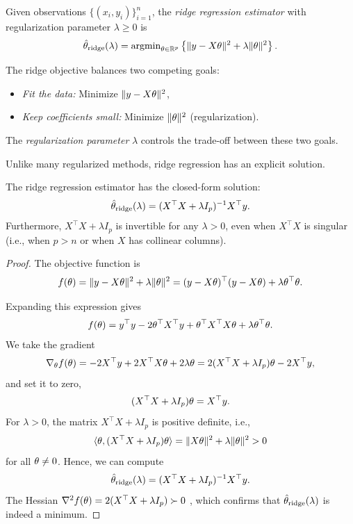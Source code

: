 \begin{definition}\label{def:ridge}
Given observations $\{(x_i, y_i)\}_{i=1}^n$, the \emph{ridge regression estimator} 
with regularization parameter $\lambda \geq 0$ is
\begin{equation}\label{eq:ridge_def}
  \hat{\theta}_{\text{ridge}}(\lambda) = \operatorname{argmin}_{\theta \in \mathbb{R}^p} 
  \left\{\|y - X\theta\|^2 + \lambda\|\theta\|^2\right\}.
\end{equation}
\end{definition}

The ridge objective balances two competing goals:
\begin{itemize}
  \item {\em Fit the data:} Minimize $\|y - X\theta\|^2$,
  \item {\em Keep coefficients small:} Minimize $\|\theta\|^2$ (regularization).
\end{itemize}
The {\em regularization parameter} $\lambda$ controls the trade-off between these two goals.

Unlike many regularized methods, ridge regression has an explicit solution.

\begin{theorem}\label{thm:ridge_solution}
The ridge regression estimator has the closed-form solution:
\begin{equation}\label{eq:ridge_normal}
  \hat{\theta}_{\text{ridge}}(\lambda) = (X^\top X + \lambda I_p)^{-1}X^\top y.
\end{equation}
Furthermore, $X^\top X + \lambda I_p$ is invertible for any $\lambda > 0$, 
even when $X^\top X$ is singular (i.e., when $p > n$ or when $X$ has 
collinear columns).
\end{theorem}

\begin{proof}
The objective function is
$$f(\theta) = \|y - X\theta\|^2 + \lambda\|\theta\|^2 
= (y - X\theta)^\top(y - X\theta) + \lambda\theta^\top\theta.$$

Expanding this expression gives
$$f(\theta) = y^\top y - 2\theta^\top X^\top y + \theta^\top X^\top X\theta + \lambda\theta^\top\theta.$$
We take the gradient 
$$\nabla_{\theta} f(\theta) = -2X^\top y + 2X^\top X\theta + 2\lambda\theta 
= 2(X^\top X + \lambda I_p)\theta - 2X^\top y,$$
and set it to zero,
$$(X^\top X + \lambda I_p)\theta = X^\top y.$$
For $\lambda > 0$, the matrix $X^\top X + \lambda I_p$ is positive definite, i.e.,
$$\langle \theta, (X^\top X + \lambda I_p)\theta \rangle = \|X\theta\|^2 + \lambda\|\theta\|^2 > 0$$
for all $\theta \neq 0$. Hence, we can compute 
$$\hat{\theta}_{\text{ridge}}(\lambda) = (X^\top X + \lambda I_p)^{-1}X^\top y.$$
The Hessian $\nabla^2 f(\theta) = 2(X^\top X + \lambda I_p) \succ 0$ , which confirms that $\hat{\theta}_{\text{ridge}}(\lambda)$ is indeed a minimum.
\end{proof}


